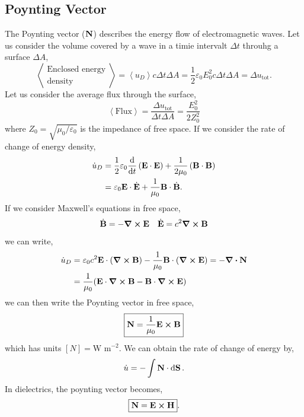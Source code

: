 \documentclass{book}
\begin{document}
\subsection{Poynting Vector}
The Poynting vector ($\vb{N}$) describes the energy flow of electromagnetic waves. Let us consider the volume covered by a wave in a timie intervalt $\Delta t$ throuhg a surface $\Delta A$,
\begin{equation}
	\left<\substack{\text{Enclosed energy}\\\text{density}}\right> = \left<u_D\right> c\Delta t \Delta A = \frac{1}{2}\varepsilon_0E_0^2c\Delta t \Delta A = \Delta u_{\text{tot}}.
\end{equation}
Let us consider the average flux through the surface,
\begin{equation}
	\left<\text{Flux}\right> = \frac{\Delta u_{\text{tot}}}{\Delta t \Delta A} = \frac{E_0^2}{2Z_0^2}
\end{equation}
where $Z_0 = \sqrt{\mu_0/\varepsilon_0}$ is the impedance of free space. If we consider the rate of change of energy density,
\begin{equation}
	\begin{split}
	\Dot{u}_D & = \frac{1}{2}\varepsilon_0\dv{t}\left(\vb{E}\cdot \vb{E}\right) + \frac{1}{2\mu_0}\left(\vb{B}\cdot\vb{B}\right) \\
	& = \varepsilon_0 \vb{E}\cdot \Dot{\vb{E}} + \frac{1}{\mu_0}\vb{B}\cdot\Dot{\vb{B}}.
	\end{split}
\end{equation}
If we consider Maxwell's equations in free space,
\begin{align}
	\Dot{\vb{B}} = - \curl{\vb{E}} && \Dot{\vb{E}} = c^2 \curl{\vb{B}}
\end{align}
we can write,
\begin{equation}
	\begin{split}
		\Dot{u}_D & = \varepsilon_0 c^2\vb{E}\cdot(\curl{\vb{B}}) - \frac{1}{\mu_0}\vb{B}\cdot(\curl{\vb{E}}) = - \div{\vb{N}} \\
		& = \frac{1}{\mu_0}(\vb{E}\cdot{\curl{\vb{B}}} - \vb{B}\cdot{\curl{\vb{E}}})
	\end{split}
\end{equation}
we can then write the Poynting vector in free space,
\begin{equation}
	\boxed{\vb{N} = \frac{1}{\mu_0}\vb{E}\cross\vb{B}}
\end{equation}
which has units $\left[N\right] = \text{W m}^{-2}$.
We can obtain the rate of change of energy by,
\begin{equation}
	\Dot{u} = - \int\vb{N}\cdot\dd{\vb{S}}.
\end{equation}
In dielectrics, the poynting vector becomes,
\begin{equation}
	\boxed{\vb{N} = \vb{E}\cross\vb{H}}.
\end{equation}
\end{document}
